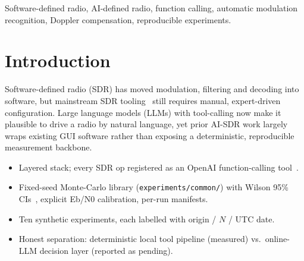\documentclass[journal]{IEEEtran}
\begin{document}
\begin{abstract}
We present MBDSDR, a full-stack AI-defined software-defined radio (SDR)
reference platform that couples a C++ real-time receive chain, a Flutter
mobile client, a Python signal-processing kernel, and an OpenAI-compatible
function-calling tool layer exposing every radio operation as an
agent-callable tool. This letter focuses on the reproducible experimental
backbone: a fixed-seed Monte-Carlo runner with Wilson-score 95\% confidence
intervals, an Eb/N0--in-band-SNR calibration convention, and per-run
manifests locking script, seed, data-origin, parameters, sample count, git
SHA and UTC timestamp. [SYNC: ten synthetic experiments, $\approx$10.4k
trials; BPSK sample-rate invariance 0.595--0.705 at fixed Eb/N0; residual
$\approx$10\,Hz Doppler collapses uncompensated decoding to 6.5\% while
known-frequency restoration holds $\approx$0.94; KNN-AMR 0.96--1.00 vs.\
classical rules 0.67--1.00 at $\ge$10\,dB; local tool pipeline handles
400 mixed calls at 1.000 graceful rate. LLM-agent arm = PENDING\_ONLINE\_RUN.]
\end{abstract}

\begin{IEEEkeywords}
Software-defined radio, AI-defined radio, function calling, automatic
modulation recognition, Doppler compensation, reproducible experiments.
\end{IEEEkeywords}

\section{Introduction}
Software-defined radio (SDR) has moved modulation, filtering and decoding into
software, but mainstream SDR tooling~\cite{gnuradio_project,sdrpp_project,satdump_project}
still requires manual, expert-driven configuration. Large language models (LLMs)
with tool-calling now make it plausible to drive a radio by natural language,
yet prior AI-SDR work largely wraps existing GUI software rather than exposing a
deterministic, reproducible measurement backbone.
\begin{itemize}
  \item Layered stack; every SDR op registered as an OpenAI function-calling
        tool~\cite{openai_function_calling}.
  \item Fixed-seed Monte-Carlo library (\texttt{experiments/common/}) with Wilson
        95\% CIs~\cite{wilson1927}, explicit Eb/N0 calibration, per-run manifests.
  \item Ten synthetic experiments, each labelled with origin / $N$ / UTC date.
  \item Honest separation: deterministic local tool pipeline (measured) vs.\ online-LLM decision layer (reported as pending).
\end{itemize}
\end{document}
